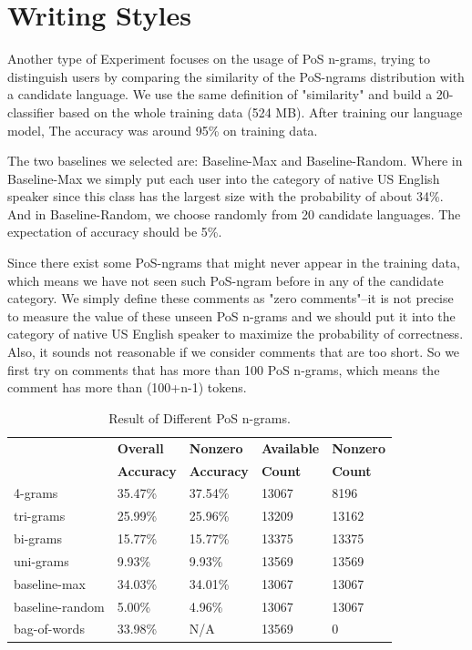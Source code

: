 \documentclass[11pt]{article}
\begin{document}
\section{Writing Styles}
Another type of Experiment focuses on the usage of PoS n-grams, trying to distinguish users by comparing the similarity of the PoS-ngrams distribution with a candidate language. We use the same definition of "similarity" and build a 20-classifier based on the whole training data (524 MB). After training our language model, The accuracy was around 95\% on training data.

The two baselines we selected are: Baseline-Max and Baseline-Random. Where in Baseline-Max we simply put each user into the category of native US English speaker since this class has the largest size with the
probability of about 34\%. And in Baseline-Random, we choose randomly from 20 candidate languages. The expectation of accuracy should be 5\%.

Since there exist some PoS-ngrams that might never appear in the training data, which means we have not seen such PoS-ngram before in any of the candidate category. We simply define these comments as "zero comments"--it is not precise to measure the value of these unseen PoS n-grams and we should put it into the category of native US English speaker to maximize the probability of correctness. Also, it sounds not reasonable if we consider comments that are too short. So we first try on comments that has more than 100 PoS n-grams, which means the comment has more than (100+n-1) tokens.

\begin{table}[h]
\begin{center}
\small\addtolength{\tabcolsep}{-5pt}
\begin{tabular}{|l|l|l|l|l|}
\hline & \bf Overall & \bf Nonzero & \bf Available & \bf Nonzero \\ 
& \bf Accuracy & \bf Accuracy & \bf Count & \bf Count \\ \hline
4-grams & 35.47\% & 37.54\%  & 13067 & 8196 \\
tri-grams & 25.99\% & 25.96\% & 13209 & 13162 \\
bi-grams & 15.77\% & 15.77\%  & 13375 & 13375\\
uni-grams & 9.93\% & 9.93\%  & 13569 & 13569 \\
baseline-max & 34.03\% & 34.01\% & 13067 & 13067 \\
baseline-random & 5.00\% & 4.96\% & 13067 & 13067 \\
bag-of-words & 33.98\% & N/A & 13569 & 0 \\
\hline
\end{tabular}
\end{center}
\caption{\label{font-table} Result of Different PoS n-grams. }
\end{table}
\end{document}
